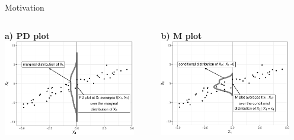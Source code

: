 \documentclass[11pt,compress,t,notes=noshow, aspectratio=169, xcolor=table]{beamer}
\begin{document}
\begin{frame}{Motivation}


\begin{columns}[T]
\begin{column}{0.5\textwidth}
\vspace*{-1em}
\centering
\textbf{a) PD plot}
\includegraphics[width=0.9\textwidth]{figure/ale_pdplot}
\end{column}
\begin{column}{0.5\textwidth}
\vspace*{-1em}
\textbf{b) M plot}
\centering
\includegraphics[width=0.9\textwidth]{figure/ale_mplot}
\end{column}
\end{columns}


\end{frame}
\end{document}
